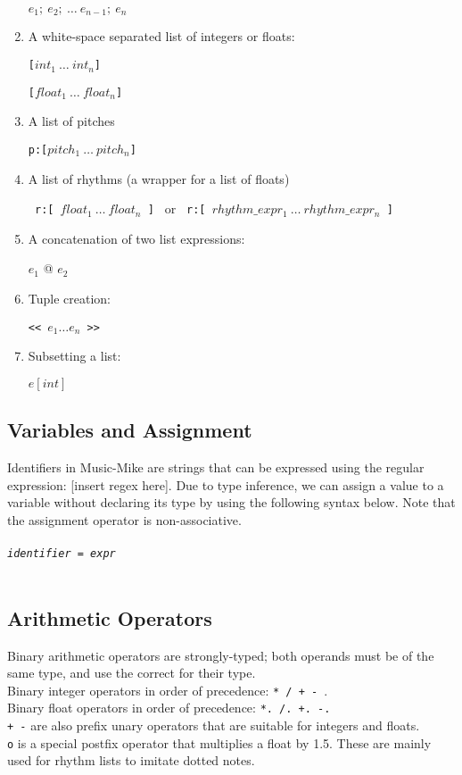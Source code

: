 \documentclass[12pt]{report}
\begin{document}
\begin{enumerate}
$e_1;\ e_2;\ \ldots\ e_{n-1};\ e_n$
\item A white-space separated list of integers or floats:

\texttt{[$int_1\ \ldots\ int_n$]}

\texttt{[$float_1\ \ldots\ float_n$]}

\item A list of pitches 

\texttt{p:[$pitch_1\ \ldots\ pitch_n$]}

\item A list of rhythms (a wrapper for a list of floats)

\texttt{ r:[ $float_1 \ \ldots \ float_n$ ] } or
\texttt{ r:[ $rhythm\_expr_1 \ \ldots \ rhythm\_expr_n$ ] }

\item A concatenation of two list expressions:

$e_1$ @ $e_2$

\item Tuple creation:

\texttt{<< $e_1 \ldots e_n$ >>}
\item Subsetting a list:

$e[int]$


\end{enumerate}

\subsection{Variables and Assignment}
Identifiers in Music-Mike are strings that can be expressed using the regular expression: [insert regex here]. 
Due to type inference, we can assign a value to a variable without declaring its type by using the following syntax below. Note that the assignment operator is non-associative.\\\\
\texttt{\emph{identifier} = \emph{expr}}\\\\

\subsection{Arithmetic Operators}
Binary arithmetic operators are strongly-typed; both operands must be of the same type, and use the correct  for their type. \\
Binary integer operators in order of precedence: \texttt{* / + - }.  \\
Binary float operators in order of precedence: \texttt{*. /. +. -. } \\
\texttt{+ -} are also prefix unary operators that are suitable for integers and floats. \\
\texttt{o} is a special postfix operator that multiplies a float by 1.5. These are mainly used for rhythm lists to imitate dotted notes. 
\end{document}
